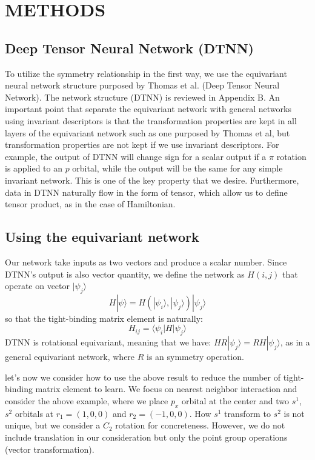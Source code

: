 \documentclass{article}
\begin{document}
\section{METHODS}

\subsection{Deep Tensor Neural Network (DTNN)}
To utilize the symmetry relationship in the first way, we use the equivariant neural network
structure purposed by Thomas et al.\cite{thomas_tensor_2018} (Deep Tensor Neural Network). 
The network structure (DTNN) is reviewed in Appendix B. 
An important point that separate the equivariant network with general networks using 
invariant descriptors is that the transformation properties are kept in all layers of the equivariant
network such as one purposed by Thomas et al, but transformation properties are not kept if we 
use invariant descriptors. For example, the output of DTNN will change sign for a scalar output  
if a $\pi$ rotation is applied to an $p$ orbital, while the output will be the same for any
simple invariant network. This is one of the key property that we desire.
Furthermore, data in DTNN naturally flow in the form of tensor, which allow us to define 
tensor product, as in the case of Hamiltonian.

\subsection{Using the equivariant network}
Our network take inputs as two vectors and produce a scalar number. Since DTNN's output is 
also vector quantity, we define the network as $H(i,j)$ that operate on vector $| \psi_j \rangle$
\begin{equation}
    H |\psi\rangle = H(| \psi_i \rangle,| \psi_j \rangle) | \psi_j \rangle
\end{equation}
so that the tight-binding matrix element is naturally:
\begin{equation}
    H_{ij} = \langle \psi_i | H | \psi_j \rangle
\end{equation}
DTNN is rotational equivariant, meaning that we have: $H R | \psi_j \rangle  = RH | \psi_j \rangle $, 
as in a general equivariant network, 
where $R$ is an symmetry operation. 

let's now we consider how to use the above result to reduce the number of 
tight-binding matrix element to learn. 
We focus on nearest neighbor interaction and consider the above example, where
we place $p_x$ orbital at the center and two $s^1$, $s^2$ orbitals at $r_1 = (1,0,0)$ and $r_2 = (-1,0,0)$. 
How $s^1$ transform to $s^2$ is not unique, but we consider a $C_2$ rotation for concreteness. 
However, we do not include translation in our consideration but only the point group 
operations (vector transformation). 
\end{document}
